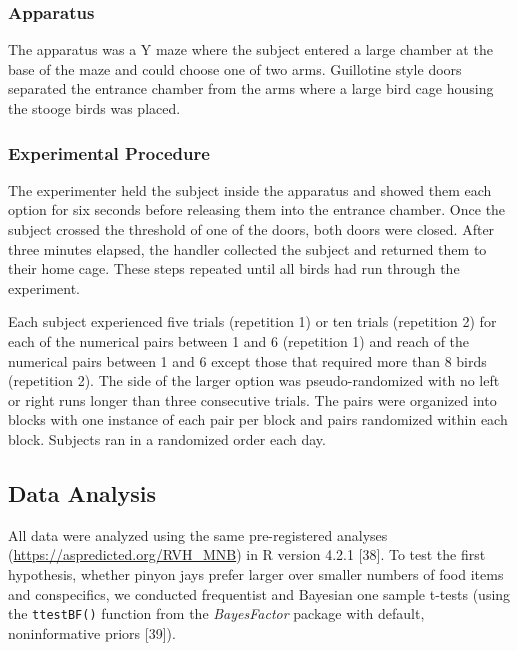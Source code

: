\documentclass[
  ,doc,floatsintext]{apa6}
\begin{document}
\hypertarget{apparatus-1}{%
\subsubsection{Apparatus}\label{apparatus-1}}

The apparatus was a Y maze where the subject entered a large chamber at the base of the maze and could choose one of two arms. Guillotine style doors separated the entrance chamber from the arms where a large bird cage housing the stooge birds was placed.

\hypertarget{experimental-procedure-1}{%
\subsubsection{Experimental Procedure}\label{experimental-procedure-1}}

The experimenter held the subject inside the apparatus and showed them each option for six seconds before releasing them into the entrance chamber. Once the subject crossed the threshold of one of the doors, both doors were closed. After three minutes elapsed, the handler collected the subject and returned them to their home cage. These steps repeated until all birds had run through the experiment.

Each subject experienced five trials (repetition 1) or ten trials (repetition 2) for each of the numerical pairs between 1 and 6 (repetition 1) and reach of the numerical pairs between 1 and 6 except those that required more than 8 birds (repetition 2). The side of the larger option was pseudo-randomized with no left or right runs longer than three consecutive trials. The pairs were organized into blocks with one instance of each pair per block and pairs randomized within each block. Subjects ran in a randomized order each day.

\hypertarget{data-analysis}{%
\subsection{Data Analysis}\label{data-analysis}}

All data were analyzed using the same pre-registered analyses (\url{https://aspredicted.org/RVH_MNB}) in R version 4.2.1 {[}38{]}. To test the first hypothesis, whether pinyon jays prefer larger over smaller numbers of food items and conspecifics, we conducted frequentist and Bayesian one sample t-tests (using the \texttt{ttestBF()} function from the \emph{BayesFactor} package with default, noninformative priors {[}39{]}).
\end{document}
